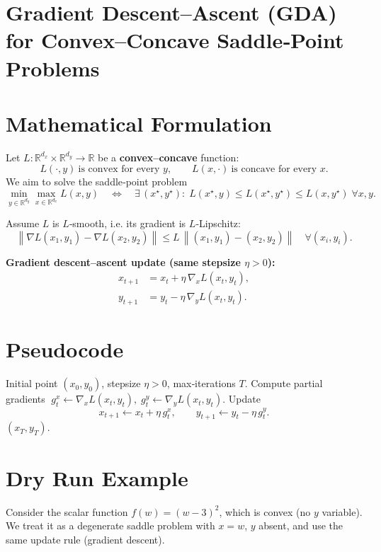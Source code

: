 \documentclass{article}
\newcommand{\norm}[1]{\left\lVert#1\right\rVert}
\begin{document}
\section*{Gradient Descent–Ascent (GDA) for Convex–Concave Saddle‑Point Problems}

\section*{Mathematical Formulation}
Let $L:\mathbb{R}^{d_x}\times\mathbb{R}^{d_y}\rightarrow\mathbb{R}$ be a \textbf{convex–concave} function:
\[
L(\cdot ,y)\ \text{is convex for every }y,\qquad 
L(x,\cdot )\ \text{is concave for every }x .
\]
We aim to solve the saddle‑point problem
\[
\min_{y\in\mathbb{R}^{d_y}}\max_{x\in\mathbb{R}^{d_x}}L(x,y)
\quad\Longleftrightarrow\quad
\exists\,(x^\star ,y^\star):\;
L(x^\star ,y)\le L(x^\star ,y^\star)\le L(x,y^\star)\;\forall x,y .
\]

Assume $L$ is $L$‑smooth, i.e. its gradient is $L$‑Lipschitz:
\[
\norm{\nabla L(x_1,y_1)-\nabla L(x_2,y_2)}\le L\,\norm{(x_1,y_1)-(x_2,y_2)}\quad\forall (x_i,y_i).
\]

\textbf{Gradient descent–ascent update (same stepsize $\eta>0$):}
\[
\boxed{
\begin{aligned}
x_{t+1}&=x_t+\eta\,\nabla_x L(x_t,y_t),\\[2mm]
y_{t+1}&=y_t-\eta\,\nabla_y L(x_t,y_t).
\end{aligned}}
\tag{1}
\]

\section*{Pseudocode}
\begin{algorithm}[H]
\caption{Gradient Descent–Ascent (GDA)}
\begin{algorithmic}[1]
\REQUIRE Initial point $(x_0,y_0)$, stepsize $\eta>0$, max‑iterations $T$.
    \STATE Compute partial gradients 
    $\;g^x_t\gets \nabla_x L(x_t,y_t),\;
      g^y_t\gets \nabla_y L(x_t,y_t)$.
    \STATE Update 
    \[
    x_{t+1}\gets x_t+\eta\,g^x_t,\qquad
    y_{t+1}\gets y_t-\eta\,g^y_t .
    \]
\ENDFOR
\RETURN $(x_T,y_T)$.
\end{algorithmic}
\end{algorithm}

\section*{Dry Run Example}
Consider the scalar function $f(w)=(w-3)^2$, which is convex (no $y$ variable).  
We treat it as a degenerate saddle problem with $x=w$, $y$ absent, and use the same update rule (gradient descent).  
\end{document}

